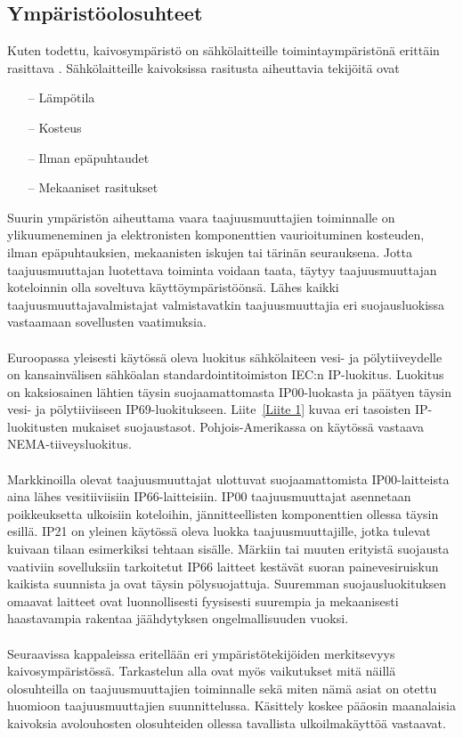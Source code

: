 \documentclass[finnish,12pt,a4paper,pdftex,elec,utf8]{aaltothesis}
\begin{document}
\subsection{Ympäristöolosuhteet}
Kuten todettu, kaivosympäristö on sähkölaitteille toimintaympäristönä erittäin rasittava \cite[s. 251]{Hakapää}. %
Sähkölaitteille kaivoksissa rasitusta aiheuttavia tekijöitä ovat
\begin{itemize}
	\item[--] Lämpötila
	\item[--] Kosteus
	\item[--] Ilman epäpuhtaudet
	\item[--] Mekaaniset rasitukset
\end{itemize}
Suurin ympäristön aiheuttama vaara taajuusmuuttajien toiminnalle on ylikuumeneminen ja elektronisten komponenttien vaurioituminen kosteuden, ilman  epäpuhtauksien, mekaanisten iskujen tai tärinän seurauksena. Jotta taajuusmuuttajan luotettava toiminta voidaan taata, täytyy taajuusmuuttajan koteloinnin olla soveltuva käyttöympäristöönsä. Lähes kaikki taajuusmuuttajavalmistajat valmistavatkin taajuusmuuttajia eri suojausluokissa vastaamaan sovellusten vaatimuksia.
\\\\
Euroopassa yleisesti käytössä oleva luokitus sähkölaiteen vesi- ja pölytiiveydelle on kansainvälisen sähköalan standardointitoimiston IEC:n IP-luokitus. Luokitus on kaksiosainen lähtien täysin suojaamattomasta IP00-luokasta ja päätyen täysin vesi- ja pölytiiviiseen IP69-luokitukseen. Liite~\ref{Liite 1} kuvaa eri tasoisten IP-luokitusten mukaiset suojaustasot. Pohjois-Amerikassa on käytössä vastaava NEMA-tiiveysluokitus.
\\\\
Markkinoilla olevat taajuusmuuttajat ulottuvat suojaamattomista IP00-laitteista aina lähes vesitiiviisiin IP66-laitteisiin. IP00 taajuusmuuttajat asennetaan poikkeuksetta ulkoisiin koteloihin, jännitteellisten komponenttien ollessa täysin esillä. IP21 on yleinen käytössä oleva luokka taajuusmuuttajille, jotka tulevat kuivaan tilaan esimerkiksi tehtaan sisälle. Märkiin tai muuten erityistä suojausta vaativiin sovelluksiin tarkoitetut IP66 laitteet kestävät suoran painevesiruiskun kaikista suunnista ja ovat täysin pölysuojattuja. Suuremman suojausluokituksen omaavat laitteet ovat luonnollisesti fyysisesti suurempia ja mekaanisesti haastavampia rakentaa jäähdytyksen ongelmallisuuden vuoksi.
\\\\
Seuraavissa kappaleissa eritellään eri ympäristötekijöiden merkitsevyys kaivosympäristössä. Tarkastelun alla ovat myös vaikutukset mitä näillä olosuhteilla on taajuusmuuttajien toiminnalle sekä miten nämä asiat on otettu huomioon taajuusmuuttajien suunnittelussa. Käsittely koskee pääosin maanalaisia kaivoksia avolouhosten olosuhteiden ollessa tavallista ulkoilmakäyttöä vastaavat. %
\end{document}
